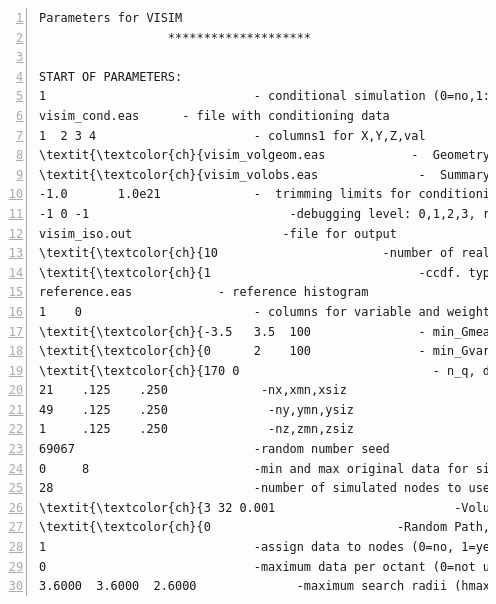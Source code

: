 \documentclass[12t]{article}
\begin{document}
\nocite{SrinavasanJournel:1998}
\nocite{GomezHernandez:2000:CapeTown}
\nocite{GomezHernandez:2004:Banff}

\nocite{Gloaguen:2005}
\nocite{Gloaguen:2004:Banff}
\nocite{Hansen:VISIM}


                     

\clearpage
\begin{table}
\scriptsize
\begin{Verbatim}[fontfamily=tt,numbers=left,commandchars=\\\{\}]
                  Parameters for VISIM
                  ********************

START OF PARAMETERS:
1                             - conditional simulation (0=no,1:(p,v), 2:(p), 3:(v)
visim_cond.eas      - file with conditioning data
1  2 3 4                      - columns1 for X,Y,Z,val
\textit{\textcolor{ch}{visim_volgeom.eas            -  Geometry of volume/ray}}
\textit{\textcolor{ch}{visim_volobs.eas              -  Summary of volgeom.eas.}}
-1.0       1.0e21             -  trimming limits for conditioning data
-1 0 -1                            -debugging level: 0,1,2,3, read\_covtab [1=from disk], read\_lambda
visim_iso.out                     -file for output
\textit{\textcolor{ch}{10                       -number of realizations to generate}}
\textit{\textcolor{ch}{1                             -ccdf. type: 0-Gaussian, 1-Dssim-histogram reproduction}}
reference.eas            - reference histogram
1    0                        - columns for variable and weights
\textit{\textcolor{ch}{-3.5   3.5  100               - min_Gmean, max_Gmean, n_Gmean}}
\textit{\textcolor{ch}{0      2    100               - min_Gvar, max_Gvar, n_Gvar}}
\textit{\textcolor{ch}{170 0                           - n_q, do\_discrete}}
21    .125    .250             -nx,xmn,xsiz
49    .125    .250              -ny,ymn,ysiz
1     .125    .250              -nz,zmn,zsiz
69067                         -random number seed
0     8                       -min and max original data for sim
28                            -number of simulated nodes to use
\textit{\textcolor{ch}{3 32 0.001                         -Volume Neighborhood, method[0,1,2] , nusevols, accept_frac}}
\textit{\textcolor{ch}{0                          -Random Path, [1] independent, [2] rays first, [3] preferential}}
1                             -assign data to nodes (0=no, 1=yes)
0                             -maximum data per octant (0=not used)
3.6000  3.6000  2.6000              -maximum search radii (hmax,hmin,vert)

\end{Verbatim}
\end{table}
\end{document}
